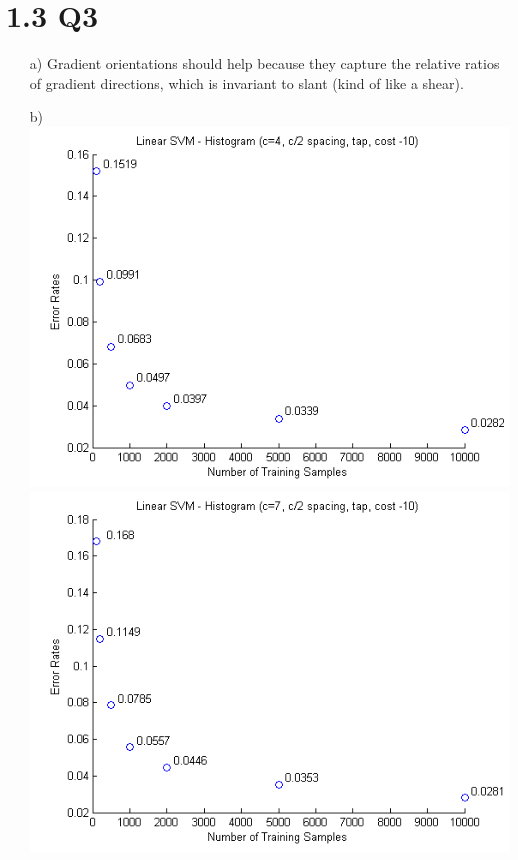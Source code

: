 \documentclass[11pt]{article}
\begin{document}
\newpage
\section*{1.3 Q3}
\begin{itemize}
\item[a)]
Gradient orientations should help because they capture the relative ratios of gradient directions, which is invariant to slant (kind of like a shear).
\item[b)]
\includegraphics[scale=0.6]{diagrams/Question13b1.png}
\includegraphics[scale=0.6]{diagrams/Question13b2.png}\\

\end{itemize}
\end{document}
